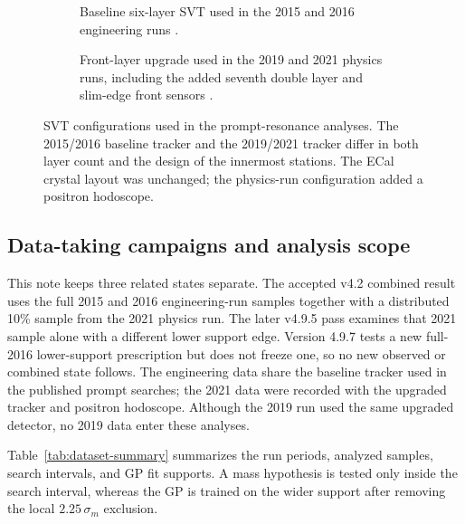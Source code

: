 \begin{figure}[H]
\centering
\begin{subfigure}[t]{0.90\linewidth}
  \centering
  \caption{Baseline six-layer SVT used in the 2015 and 2016 engineering runs
  \cite{HPS2016BumpInternal}.}
\end{subfigure}

\vspace{0.9em}

\begin{subfigure}[t]{0.78\linewidth}
  \centering
  \caption{Front-layer upgrade used in the 2019 and 2021 physics runs, including the
  added seventh double layer and slim-edge front sensors
  \cite{HPSExperiment2022,HPSSlimEdgeSensors2020}.}
\end{subfigure}
\caption{SVT configurations used in the prompt-resonance analyses. The 2015/2016
baseline tracker and the 2019/2021 tracker differ in both layer count and the design
of the innermost stations. The ECal crystal layout was unchanged; the physics-run
configuration added a positron hodoscope.}
\label{fig:hps-svt-eras}
\end{figure}

\subsection{Data-taking campaigns and analysis scope}

This note keeps three related states separate.  The accepted v4.2 combined result uses
the full 2015 and 2016 engineering-run samples together with a distributed 10\% sample
from the 2021 physics run.  The later v4.9.5 pass examines that 2021 sample alone with a
different lower support edge.  Version 4.9.7 tests a new full-2016 lower-support
prescription but does not freeze one, so no new observed or combined state follows.
The engineering data share the baseline tracker used in the published prompt searches;
the 2021 data were recorded with the upgraded tracker and positron hodoscope. Although
the 2019 run used the same upgraded detector, no 2019 data enter these analyses.

Table~\ref{tab:dataset-summary} summarizes the run periods, analyzed samples, search
intervals, and GP fit supports. A mass hypothesis is tested only inside the search
interval, whereas the GP is trained on the wider support after removing the local
$2.25\,\sigma_m$ exclusion.


